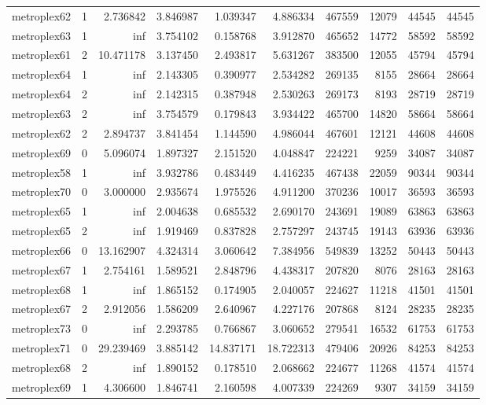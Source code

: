 \documentclass[../../../thesis.tex]{subfiles}
\begin{document}
\begin{longtable}{|l|r|r|r|r|r|r|r|r|r|}
metroplex62 & 1 & 2.736842 & 3.846987 & 1.039347 & 4.886334 & 467559 & 12079 & 44545 & 44545 \\
metroplex63 & 1 & inf & 3.754102 & 0.158768 & 3.912870 & 465652 & 14772 & 58592 & 58592 \\
metroplex61 & 2 & 10.471178 & 3.137450 & 2.493817 & 5.631267 & 383500 & 12055 & 45794 & 45794 \\
metroplex64 & 1 & inf & 2.143305 & 0.390977 & 2.534282 & 269135 & 8155 & 28664 & 28664 \\
metroplex64 & 2 & inf & 2.142315 & 0.387948 & 2.530263 & 269173 & 8193 & 28719 & 28719 \\
metroplex63 & 2 & inf & 3.754579 & 0.179843 & 3.934422 & 465700 & 14820 & 58664 & 58664 \\
metroplex62 & 2 & 2.894737 & 3.841454 & 1.144590 & 4.986044 & 467601 & 12121 & 44608 & 44608 \\
metroplex69 & 0 & 5.096074 & 1.897327 & 2.151520 & 4.048847 & 224221 & 9259 & 34087 & 34087 \\
metroplex58 & 1 & inf & 3.932786 & 0.483449 & 4.416235 & 467438 & 22059 & 90344 & 90344 \\
metroplex70 & 0 & 3.000000 & 2.935674 & 1.975526 & 4.911200 & 370236 & 10017 & 36593 & 36593 \\
metroplex65 & 1 & inf & 2.004638 & 0.685532 & 2.690170 & 243691 & 19089 & 63863 & 63863 \\
metroplex65 & 2 & inf & 1.919469 & 0.837828 & 2.757297 & 243745 & 19143 & 63936 & 63936 \\
metroplex66 & 0 & 13.162907 & 4.324314 & 3.060642 & 7.384956 & 549839 & 13252 & 50443 & 50443 \\
metroplex67 & 1 & 2.754161 & 1.589521 & 2.848796 & 4.438317 & 207820 & 8076 & 28163 & 28163 \\
metroplex68 & 1 & inf & 1.865152 & 0.174905 & 2.040057 & 224627 & 11218 & 41501 & 41501 \\
metroplex67 & 2 & 2.912056 & 1.586209 & 2.640967 & 4.227176 & 207868 & 8124 & 28235 & 28235 \\
metroplex73 & 0 & inf & 2.293785 & 0.766867 & 3.060652 & 279541 & 16532 & 61753 & 61753 \\
metroplex71 & 0 & 29.239469 & 3.885142 & 14.837171 & 18.722313 & 479406 & 20926 & 84253 & 84253 \\
metroplex68 & 2 & inf & 1.890152 & 0.178510 & 2.068662 & 224677 & 11268 & 41574 & 41574 \\
metroplex69 & 1 & 4.306600 & 1.846741 & 2.160598 & 4.007339 & 224269 & 9307 & 34159 & 34159 \\

\end{longtable}
\end{document}
